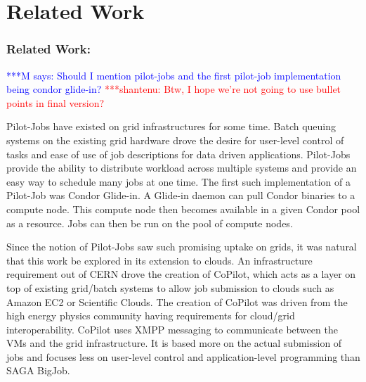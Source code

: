 \documentclass[times]{cpeauth}
\newcommand{\jhanote}[1]{ {\textcolor{red} { ***shantenu: #1 }}}
\newcommand{\mrnote}[1]{ {\textcolor{blue} { ***M says: #1 }}}
\newcommand{\pmnote}[1]{ {\textcolor{blue} { ***Pradeep: #1 }}}
\newcommand{\note}[1]{ {\textcolor{magenta} { ***Note: #1 }}}
\newcommand{\mrnote}[1]{}
\newcommand{\pmnote}[1]{}
\newcommand{\jhanote}[1]{}
\newcommand{\note}[1]{}
\newcommand{\pilotjob}{Pilot-Job\xspace}
\newcommand{\pilotjobs}{Pilot-Jobs\xspace}
\begin{document}






\section{Related Work}


\subsubsection*{Related Work:} 


\mrnote{Should I mention pilot-jobs and the first pilot-job implementation being condor glide-in?}
\jhanote{Btw, I hope we're not going to use bullet points in final version?}

\pilotjobs have existed on grid infrastructures for some time. Batch queuing
systems on the existing grid hardware drove the desire for user-level control
of tasks and ease of use of job descriptions for data driven applications.
\pilotjobs provide the ability to distribute workload across multiple systems
and provide an easy way to schedule many jobs at one time. The first such
implementation of a \pilotjob was Condor Glide-in\cite{glidein}. A Glide-in
daemon can pull Condor binaries to a compute node. This compute node then
becomes available in a given Condor pool as a resource. Jobs can then be run
on the pool of compute nodes.

Since the notion of \pilotjobs saw such promising uptake on grids, it
was natural that this work be explored in its extension to clouds. An
infrastructure requirement out of CERN drove the creation of
CoPilot\cite{copilot-tr}, which acts as a layer on top of existing
grid/batch systems to allow job submission to clouds such as Amazon
EC2 or Scientific Clouds. The creation of CoPilot was driven from the
high energy physics community having requirements for cloud/grid
interoperability. CoPilot uses XMPP messaging to communicate between
the VMs and the grid infrastructure. It is based more on the actual
submission of jobs and focuses less on user-level control and
application-level programming than SAGA BigJob.
\end{document}
